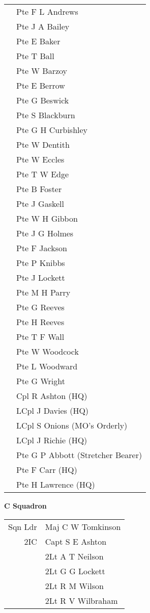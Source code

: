 \begin{center}
\begin{tabular}{rl}
    & Pte F L Andrews \\
    & Pte J A Bailey \\
    & Pte E Baker \\
    & Pte T Ball \\
    & Pte W Barzoy \\
    & Pte E Berrow \\
    & Pte G Beswick \\
    & Pte S Blackburn \\
    & Pte G H Curbishley \\
    & Pte W Dentith \\
    & Pte W Eccles \\
    & Pte T W Edge \\
    & Pte B Foster \\
    & Pte J Gaskell \\
    & Pte W H Gibbon \\
    & Pte J G Holmes \\
    & Pte F Jackson \\
    & Pte P Knibbs \\
    & Pte J Lockett \\
    & Pte M H Parry \\
    & Pte G Reeves \\
    & Pte H Reeves \\
    & Pte T F Wall \\
    & Pte W Woodcock \\
    & Pte L Woodward \\
    & Pte G Wright \\
    & Cpl R Ashton (HQ) \\
    & LCpl J Davies (HQ) \\
    & LCpl S Onions (MO's Orderly) \\
    & LCpl J Richie (HQ) \\
    & Pte G P Abbott (Stretcher Bearer) \\
    & Pte F Carr (HQ) \\
    & Pte H Lawrence (HQ) \\
  \end{tabular}
\end{center}

\begin{center}
  \Large
  \textbf{C Squadron}
\end{center}

\begin{center}
  \begin{tabular}{rl}
    Sqn Ldr & Maj C W Tomkinson \\
    2IC & Capt S E Ashton \\
    & 2Lt A T Neilson \\
    & 2Lt G G Lockett \\
    & 2Lt R M Wilson \\
    & 2Lt R V Wilbraham \\
  \end{tabular}
\end{center}

